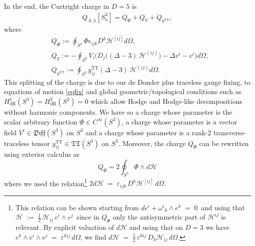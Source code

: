 \documentclass[a4paper,12pt]{article}
\begin{document}
In the end, the Curtright charge in $D=5$ is 
\begin{equation}
\begin{aligned}
Q_{\Lambda, \lambda}[S^{3}_u]=Q_{\Phi}+Q_V+Q_{y^\text{TT}},
    \end{aligned}
\end{equation}  
where 
\begin{equation}
\begin{aligned}
   & Q_{\Phi}:=\oint_{S^3}\Phi\epsilon_{ijk}D^k\mathcal{H}^{[ij]}d\Omega,\\
   &Q_V:=-\oint_{S^3} V_i\bigg(D_{j}\big((\Delta-3)\,\mathcal{H}^{(ij)}\big)-\Delta v^i -v^i\bigg)d\Omega, \\
   &Q_{y^\text{TT}}:=\oint_{S^3}y_{ij}^\text{TT}(\Delta-3)\,\mathcal{H}^{(ij)}d\Omega.
\end{aligned}    
\end{equation}
This splitting of the charge is due to our de Donder plus traceless gauge fixing, to equations of motion \eqref{eqfix} and global geometric/topological conditions such as $H^1_{\text{dR}}(S^3)=H^2_{\text{dR}}(S^3)=0$ which allow Hodge and Hodge-like decompositions without harmonic components. We have so a charge whose parameter is the scalar arbitrary function $\Phi \in C^{\infty}(S^3)$, a charge whose parameter is a vector field $V^i  \in \mathfrak{Diff}(S^3)$ on $S^3$ and a charge whose parameter is a rank-2 transverse-traceless tensor $y_{ij}^\text{TT} \in \mathfrak{{TT}}(S^3)$ on $S^3$. Moreover, the charge $Q_{\Phi}$ can be rewritten using exterior calculus as
\begin{equation}
    Q_{\Phi}=2\oint_{S^3}\Phi \wedge d\mathcal{H}
\end{equation}
where we used the relation\footnote{This relation can be shown starting from 
$de^i + \omega^i{}_k \wedge e^k \;=\; 0 \,$ and using that $\mathcal{H} \;:=\; \frac12\,\mathcal{H}_{ij}\,e^i \wedge e^j \, $ since in $Q_{\Phi}$ only the antisymmetric part of $\mathcal{H}^{ij}$ is relevant. By explicit valuation of $d\mathcal{H}$ and using that on $D=3$ we have $e^k \wedge e^i \wedge e^j \;=\; \varepsilon^{kij}\,d\Omega$, we find $d\mathcal{H}
\;=\;
\frac12\,\varepsilon^{kij}\,D_k\mathcal{H}_{ij}\,d\Omega.$} $2d\mathcal{H}
\;=\;
\varepsilon_{ijk}\,D^k \mathcal{H}^{[ij]}\,d\Omega.$
\end{document}
